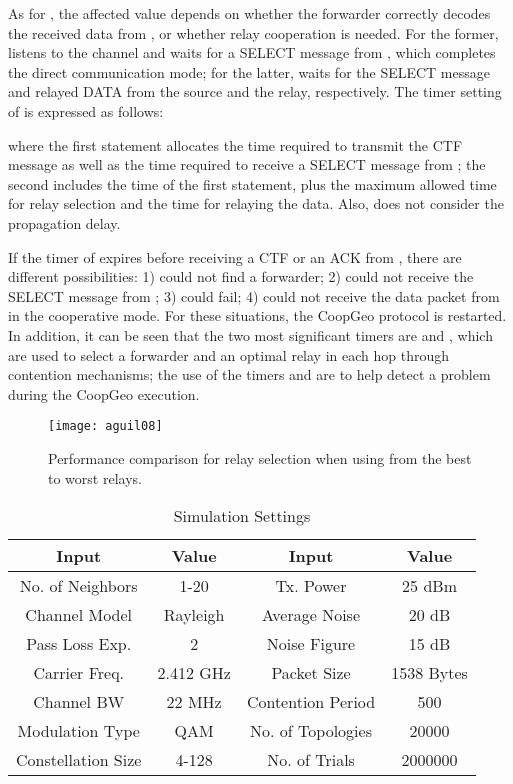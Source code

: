 \documentclass[journal,twoside,final]{IEEEtran}
\begin{document}
As for , the affected value depends on whether the forwarder  correctly decodes the received data from , or whether relay cooperation is needed. For the former,  listens to the channel and waits for a SELECT message from , which completes the direct communication mode; for the latter,  waits for the SELECT message and relayed DATA from the source and the relay, respectively. The timer setting of  is expressed as follows:

where the first statement allocates the time required to transmit the CTF message as well as the time required to receive a SELECT message from ; the second includes the time of the first statement, plus the maximum allowed time for relay selection and the time for relaying the data. Also,  does not consider the propagation delay.


If the timer  of  expires before receiving a CTF or an ACK from , there are different possibilities: 1)  could not find a forwarder; 2)  could not receive the SELECT message from ; 3)  could fail; 4)  could not receive the data packet from  in the cooperative mode. For these situations, the CoopGeo protocol is restarted.
In addition, it can be seen that the two most significant timers are  and , which are used to select a forwarder  and an optimal relay  in each hop through contention mechanisms; the use of the timers  and  are to help detect a problem during the CoopGeo execution.

\begin{figure}[t]
  \centering
  \texttt{[image: aguil08]}
  \caption{Performance comparison for relay selection when using from the best to worst relays. }\label{fig:relaysel}
\end{figure}

\begin{table}[t]
\renewcommand{\arraystretch}{1.3}
\caption{Simulation Settings}
\label{table2}
\centering
\begin{tabular}{c|c|c|c}
\hline
\bfseries Input & \bfseries Value  & \bfseries Input & \bfseries Value \\
\hline\hline
No. of Neighbors & 1-20 & Tx. Power & 25 dBm \\
Channel Model & Rayleigh & Average Noise & 20 dB \\
Pass Loss Exp. & 2 & Noise Figure & 15 dB \\
Carrier Freq. &  2.412 GHz & Packet Size & 1538 Bytes \\
Channel BW & 22 MHz & Contention Period & 500  \\
Modulation Type & QAM & No. of Topologies & 20000 \\
Constellation Size  & 4-128 & No. of Trials & 2000000 \\
\hline
\end{tabular}
\end{table}
\end{document}
